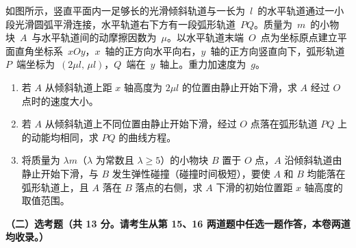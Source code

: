 \begin{question}
如图所示，竖直平面内一足够长的光滑倾斜轨道与一长为~$l$~的水平轨道通过一小段光滑圆弧平滑连接，水平轨道右下方有一段弧形轨道~$PQ$。质量为~$m$~的小物块~$A$~与水平轨道间的动摩擦因数为~$\mu$。以水平轨道末端~$O$~点为坐标原点建立平面直角坐标系~$xOy$，$x$~轴的正方向水平向右，$y$~轴的正方向竖直向下，弧形轨道~$P$~端坐标为~$(2\mu l,\,\mu l)$，$Q$~端在~$y$~轴上。重力加速度为~$g$。


\begin{enumerate}[leftmargin=2em, label=(\arabic*)]
  \item 若 $A$ 从倾斜轨道上距 $x$ 轴高度为 $2\mu l$ 的位置由静止开始下滑，求 $A$ 经过 $O$ 点时的速度大小。
  \item 若 $A$ 从倾斜轨道上不同位置由静止开始下滑，经过 $O$ 点落在弧形轨道 $PQ$ 上的动能均相同，求 $PQ$ 的曲线方程。
  \item 将质量为 $\lambda m$（$\lambda$ 为常数且 $\lambda\ge5$）的小物块 $B$ 置于 $O$ 点，$A$ 沿倾斜轨道由静止开始下滑，与 $B$ 发生弹性碰撞（碰撞时间极短），要使 $A$ 和 $B$ 均能落在弧形轨道上，且 $A$ 落在 $B$ 落点的右侧，求 $A$ 下滑的初始位置距 $x$ 轴高度的取值范围。
\end{enumerate}
\end{question}

\textbf{（二）选考题（共 13 分。请考生从第 15、16 两道题中任选一题作答，本卷两道均收录。）}

